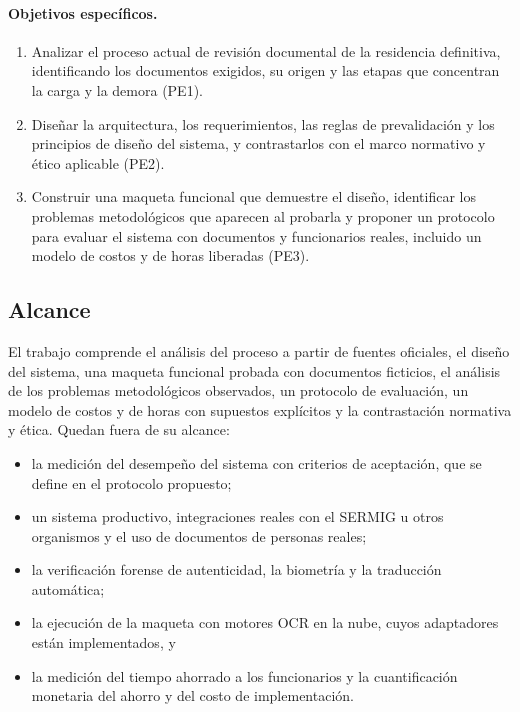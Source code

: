 \documentclass[11pt,a4paper]{article}
\begin{document}
\paragraph{Objetivos específicos.}
\begin{enumerate}[label=\textbf{OE\arabic*.},leftmargin=*]
  \item Analizar el proceso actual de revisión documental de la residencia definitiva, identificando los documentos exigidos, su origen y las etapas que concentran la carga y la demora (PE1).
  \item Diseñar la arquitectura, los requerimientos, las reglas de prevalidación y los principios de diseño del sistema, y contrastarlos con el marco normativo y ético aplicable (PE2).
  \item Construir una maqueta funcional que demuestre el diseño, identificar los problemas metodológicos que aparecen al probarla y proponer un protocolo para evaluar el sistema con documentos y funcionarios reales, incluido un modelo de costos y de horas liberadas (PE3).
\end{enumerate}

\subsection{Alcance}
El trabajo comprende el análisis del proceso a partir de fuentes oficiales, el diseño del sistema, una maqueta funcional probada con documentos ficticios, el análisis de los problemas metodológicos observados, un protocolo de evaluación, un modelo de costos y de horas con supuestos explícitos y la contrastación normativa y ética. Quedan fuera de su alcance:
\begin{itemize}
  \item la medición del desempeño del sistema con criterios de aceptación, que se define en el protocolo propuesto;
  \item un sistema productivo, integraciones reales con el SERMIG u otros organismos y el uso de documentos de personas reales;
  \item la verificación forense de autenticidad, la biometría y la traducción automática;
  \item la ejecución de la maqueta con motores OCR en la nube, cuyos adaptadores están implementados, y
  \item la medición del tiempo ahorrado a los funcionarios y la cuantificación monetaria del ahorro y del costo de implementación.
\end{itemize}
\end{document}
